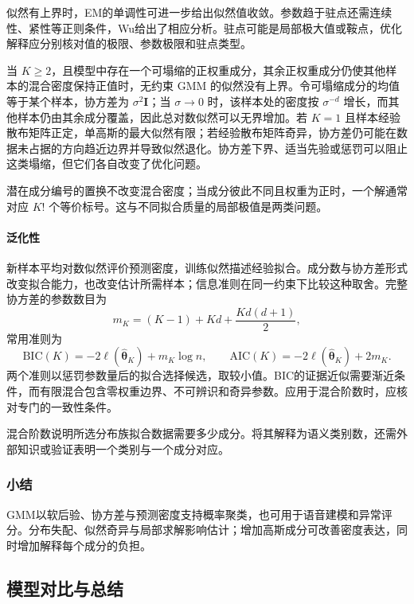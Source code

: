 似然有上界时，EM的单调性可进一步给出似然值收敛。参数趋于驻点还需连续性、紧性等正则条件，Wu给出了相应分析。驻点可能是局部极大值或鞍点，优化解释应分别核对值的极限、参数极限和驻点类型。

当 $K\geq2$，且模型中存在一个可塌缩的正权重成分，其余正权重成分仍使其他样本的混合密度保持正值时，无约束 GMM 的似然没有上界。令可塌缩成分的均值等于某个样本，协方差为 $\sigma^2\bm{I}$；当 $\sigma\to0$ 时，该样本处的密度按 $\sigma^{-d}$ 增长，而其他样本仍由其余成分覆盖，因此总对数似然可以无界增加。若 $K=1$ 且样本经验散布矩阵正定，单高斯的最大似然有限；若经验散布矩阵奇异，协方差仍可能在数据未占据的方向趋近边界并导致似然退化。协方差下界、适当先验或惩罚可以阻止这类塌缩，但它们各自改变了优化问题。

潜在成分编号的置换不改变混合密度；当成分彼此不同且权重为正时，一个解通常对应 $K!$ 个等价标号。这与不同拟合质量的局部极值是两类问题。

\paragraph{泛化性}
新样本平均对数似然评价预测密度，训练似然描述经验拟合。成分数与协方差形式改变拟合能力，也改变估计所需样本；信息准则在同一约束下比较这种取舍。完整协方差的参数数目为
\[
 m_K=(K-1)+Kd+\frac{Kd(d+1)}{2},
\]
常用准则为
\begin{equation}
 \mathrm{BIC}(K)=-2\ell(\hat{\bm{\theta}}_K)+m_K\log n,
 \qquad
 \mathrm{AIC}(K)=-2\ell(\hat{\bm{\theta}}_K)+2m_K.
 \label{eq:clustering-bic}
\end{equation}
两个准则以惩罚参数量后的拟合选择候选，取较小值。BIC的证据近似需要渐近条件，而有限混合包含零权重边界、不可辨识和奇异参数。应用于混合阶数时，应核对专门的一致性条件。

混合阶数说明所选分布族拟合数据需要多少成分。将其解释为语义类别数，还需外部知识或验证表明一个类别与一个成分对应。

\subsubsection{小结}

GMM以软后验、协方差与预测密度支持概率聚类，也可用于语音建模和异常评分。分布失配、似然奇异与局部求解影响估计；增加高斯成分可改善密度表达，同时增加解释每个成分的负担。

\subsection{模型对比与总结}

